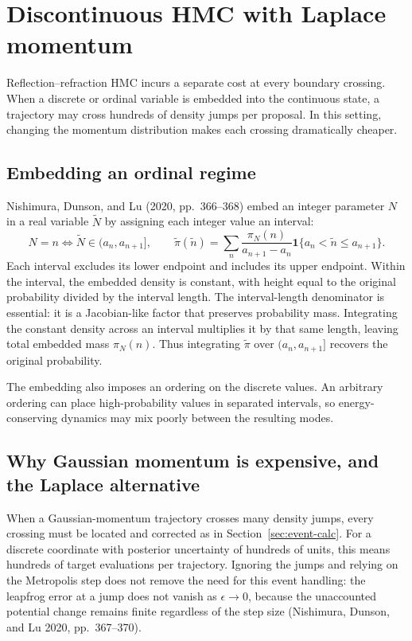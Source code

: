 \documentclass[11pt]{article}
\begin{document}
\section{Discontinuous HMC with Laplace momentum}\label{sec:dhmc}

Reflection--refraction HMC incurs a separate cost at every boundary crossing.
When a discrete or ordinal variable is embedded into the continuous state,
a trajectory may cross hundreds of density jumps per proposal. In this
setting, changing the momentum distribution makes each crossing dramatically
cheaper.

\subsection{Embedding an ordinal regime}\label{sec:dhmc-embed}

Nishimura, Dunson, and Lu (2020, pp.~366--368) embed an integer parameter
$N$ in a real variable $\widetilde N$ by assigning each integer value
an interval:
\begin{equation}\label{eq:62}
 N=n \iff \widetilde N\in(a_n,a_{n+1}],\qquad
 \widetilde\pi(\widetilde n)=
 \sum_n\frac{\pi_N(n)}{a_{n+1}-a_n}
 \mathbf 1\{a_n<\widetilde n\leq a_{n+1}\}.
\end{equation}
Each interval excludes its lower endpoint and includes its upper endpoint.
Within the interval, the embedded density is constant, with height equal to
the original probability divided by the interval length. The interval-length
denominator is essential: it is a Jacobian-like factor that preserves
probability mass. Integrating the constant density across an interval
multiplies it by that same length, leaving total embedded mass
$\pi_N(n)$. Thus integrating $\widetilde\pi$ over $(a_n,a_{n+1}]$ recovers the
original probability.

The embedding also imposes an ordering on the discrete values. An arbitrary
ordering can place high-probability values in separated intervals, so
energy-conserving dynamics may mix poorly between the resulting modes.

\subsection{Why Gaussian momentum is expensive, and the Laplace alternative}\label{sec:dhmc-laplace}

When a Gaussian-momentum trajectory crosses many density jumps, every
crossing must be located and corrected as in Section~\ref{sec:event-calc}.
For a discrete coordinate with posterior uncertainty of hundreds of units,
this means hundreds of target evaluations per trajectory. Ignoring the jumps
and relying on the Metropolis step does not remove the need for this event
handling: the leapfrog error at a jump does not vanish as
$\epsilon\to0$, because the unaccounted potential change remains finite
regardless of the step size (Nishimura, Dunson, and Lu 2020,
pp.~367--370).
\end{document}
